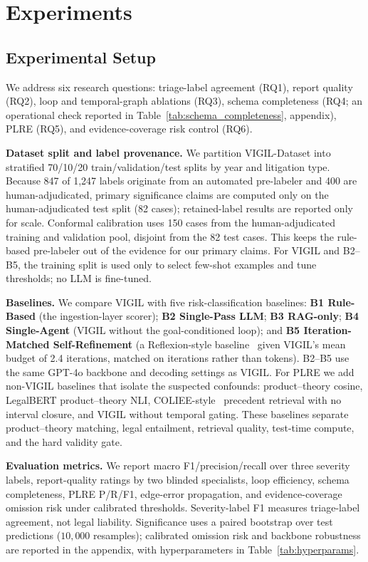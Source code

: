 
\section{Experiments}
\label{sec:evaluation}

\subsection{Experimental Setup}

We address six research questions: triage-label agreement (RQ1), report quality (RQ2), loop and temporal-graph ablations (RQ3), schema completeness (RQ4; an operational check reported in Table~\ref{tab:schema_completeness}, appendix), PLRE (RQ5), and evidence-coverage risk control (RQ6).

\textbf{Dataset split and label provenance.} We partition VIGIL-Dataset into stratified 70/10/20 train/validation/test splits by year and litigation type. Because 847 of 1{,}247 labels originate from an automated pre-labeler and 400 are human-adjudicated, primary significance claims are computed only on the human-adjudicated test split (82 cases); retained-label results are reported only for scale. Conformal calibration uses 150 cases from the human-adjudicated training and validation pool, disjoint from the 82 test cases. This keeps the rule-based pre-labeler out of the evidence for our primary claims. For VIGIL and B2--B5, the training split is used only to select few-shot examples and tune thresholds; no LLM is fine-tuned.

\textbf{Baselines.} We compare VIGIL with five risk-classification baselines: \textbf{B1 Rule-Based} (the ingestion-layer scorer); \textbf{B2 Single-Pass LLM}; \textbf{B3 RAG-only}; \textbf{B4 Single-Agent} (VIGIL without the goal-conditioned loop); and \textbf{B5 Iteration-Matched Self-Refinement} (a Reflexion-style baseline~\citep{shinn2023reflexion} given VIGIL's mean budget of 2.4 iterations, matched on iterations rather than tokens). B2--B5 use the same GPT-4o backbone and decoding settings as VIGIL. For PLRE we add non-VIGIL baselines that isolate the suspected confounds: product--theory cosine, LegalBERT product--theory NLI, COLIEE-style~\citep{rabelo2022coliee} precedent retrieval with no interval closure, and VIGIL without temporal gating. These baselines separate product--theory matching, legal entailment, retrieval quality, test-time compute, and the hard validity gate.

\textbf{Evaluation metrics.} We report macro F1/precision/recall over three severity labels, report-quality ratings by two blinded specialists, loop efficiency, schema completeness, PLRE P/R/F1, edge-error propagation, and evidence-coverage omission risk under calibrated thresholds. Severity-label F1 measures triage-label agreement, not legal liability. Significance uses a paired bootstrap over test predictions ($10{,}000$ resamples); calibrated omission risk and backbone robustness are reported in the appendix, with hyperparameters in Table~\ref{tab:hyperparams}.


